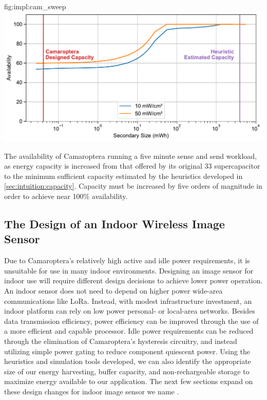 \begin{definefigure}{fig:impl:cam_sweep}
    \centering
    \includegraphics[width=\linewidth]{figs/chap6/camaroptera_simulation.pdf}
    \caption{
        The availability of Camaroptera running a five minute sense and send workload, as energy capacity is increased from that offered by its original 33\ssi{\milli\farad} supercapacitor to the minimum sufficient capacity estimated by the heuristics developed in \cref{sec:intuition:capacity}.
        Capacity must be increased by five orders of magnitude in order to achieve near 100\% availability.
     }
\end{definefigure}

\subsection{The Design of an Indoor Wireless Image Sensor}
Due to Camaroptera's relatively high active and idle power requirements, it is unsuitable for use in many indoor environments. 
Designing an image sensor for indoor use will require different design decisions to achieve lower power operation.
An indoor sensor does not need to depend on higher power wide-area communications like LoRa. Instead, with  modest infrastructure investment, an indoor platform can rely on low power personal- or local-area networks.
Besides data transmission efficiency, power efficiency can be improved through the use of a more efficient and capable processor.
Idle power requirements can be reduced through the elimination of Camaroptera's hysteresis circuitry, and instead utilizing simple power gating to reduce component quiescent power. 
Using the heuristics and simulation tools developed, we can also identify the appropriate size of our energy harvesting, buffer capacity, and non-rechargeable storage to maximize energy available to our application. 
The next few sections expand on these design changes for indoor image sensor we name \namec.

